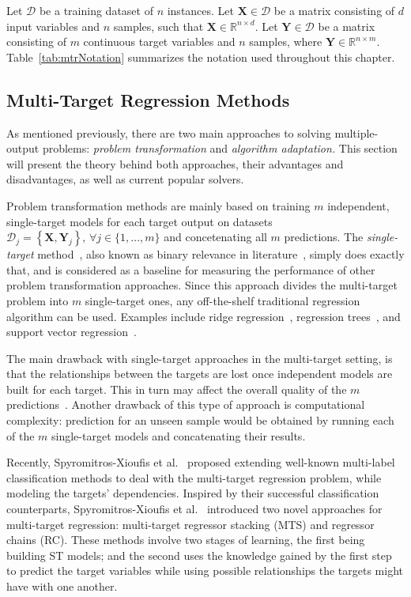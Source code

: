 \documentclass[reqno]{vcuthesis}
\newcommand{\set}[1]{{\left\{#1\right\}}}
\numberwithin{equation}{chapter}
\begin{document}
Let $\mathcal{D}$ be a training dataset of $n$ instances. Let $\bm{X} \in \mathcal{D}$ be a matrix consisting of $d$ input variables and $n$ samples, such that $\bm{X} \in \mathbb{R}^{n \times d}$. Let $\bm{Y} \in \mathcal{D}$ be a matrix consisting of $m$ continuous target variables and $n$ samples,  where $\bm{Y} \in \mathbb{R}^{n \times m}$. Table~\ref{tab:mtrNotation} summarizes the notation used throughout this chapter.

\subsection{Multi-Target Regression Methods}
As mentioned previously, there are two main approaches to solving multiple-output problems: \textit{problem transformation} and \textit{algorithm adaptation.} This section will present the theory behind both approaches, their advantages and disadvantages, as well as current popular solvers.

Problem transformation methods are mainly based on training $m$ independent, single-target models for each target output on datasets $\mathcal{D}_j = \set{\bm X, \bm Y_j},\, \forall j \in \{1, \ldots, m\}$ and concetenating all $m$ predictions. The \textit{single-target} method~\cite{Spyromitros2014}, also known as binary relevance in literature~\cite{Zhang20141819}, simply does exactly that, and is considered as a baseline for measuring the performance of other problem transformation approaches. Since this approach divides the multi-target problem into $m$ single-target ones, any off-the-shelf traditional regression algorithm can be used. Examples include ridge regression~\cite{hoerl1970ridge}, regression trees~\cite{Breiman1996}, and support vector regression~\cite{Drucker1997}.

The main drawback with single-target approaches in the multi-target setting, is that the relationships between the targets are lost once independent models are built for each target. This in turn may affect the overall quality of the $m$ predictions~\cite{Borchani2015}. Another drawback of this type of approach is computational complexity: prediction for an unseen sample would be obtained by running each of the $m$ single-target models and concatenating their results. 

Recently, Spyromitros-Xioufis et al.~\cite{Spyromitros2014} proposed extending well-known multi-label classification methods to deal with the multi-target regression problem, while modeling the targets' dependencies. Inspired by their successful classification counterparts, Spyromitros-Xioufis et al.~\cite{Spyromitros2014} introduced two novel approaches for multi-target regression: multi-target regressor stacking (MTS) and regressor chains (RC). These methods involve two stages of learning, the first being building ST models; and the second uses the knowledge gained by the first step to predict the target variables while using possible relationships the targets might have with one another. 
\end{document}
